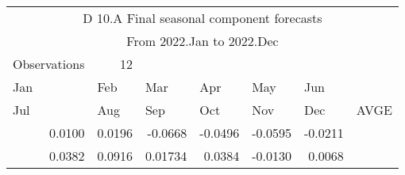\begin{tabular}{rrrrrrr}
\toprule
\multicolumn{7}{c}{D 10.A  Final seasonal component forecasts} \\
\multicolumn{7}{c}{  From  2022.Jan to 2022.Dec} \\
\multicolumn{1}{l}{  Observations} & 12    &       &       &       &       &  \\
\midrule
\multicolumn{1}{l}{Jan} & \multicolumn{1}{l}{Feb } & \multicolumn{1}{l}{Mar} & \multicolumn{1}{l}{Apr} & \multicolumn{1}{l}{May} & \multicolumn{1}{l}{Jun } &  \\
\multicolumn{1}{l}{Jul} & \multicolumn{1}{l}{Aug} & \multicolumn{1}{l}{Sep} & \multicolumn{1}{l}{Oct} & \multicolumn{1}{l}{Nov} & \multicolumn{1}{l}{Dec} & \multicolumn{1}{l}{AVGE  } \\
\midrule
0.0100 & 0.0196 & -0.0668 & -0.0496 & -0.0595 & -0.0211 \\
0.0382 & 0.0916 & 0.01734 & 0.0384 & -0.0130 & 0.0068 \\ 
\bottomrule
\end{tabular}%
